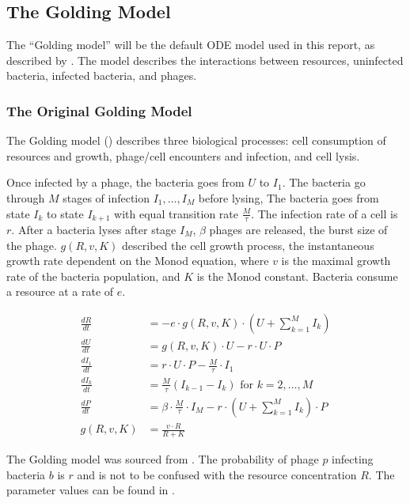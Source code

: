 \subsection{The Golding Model}
\label{sec:golding_model}
The “Golding model” will be the default ODE model used in this report, as described by \citet{gengUsingBacterialPopulation2024}. 
The model describes the interactions between resources, uninfected bacteria, infected bacteria, and phages. 

\subsubsection{The Original Golding Model}
The Golding model () describes three biological processes: cell consumption of resources and growth, phage/cell encounters and infection, and cell lysis. 

Once infected by a phage, the bacteria goes from $U$ to $I_1$. 
The bacteria go through $M$ stages of infection $I_1, \dots, I_M$ before lysing, 
The bacteria goes from state $I_k$ to state $I_{k+1}$ with equal transition rate $\frac{M}{\tau}$. 
The infection rate of a cell is $r$. 
After a bacteria lyses after stage $I_M$, $\beta$ phages are released, the burst size of the phage. 
$g(R, v, K)$ described the cell growth process, the instantaneous growth rate dependent on the Monod equation, where $v$ is the maximal growth rate of the bacteria population, and $K$ is the Monod constant. 
Bacteria consume a resource at a rate of $e$. 

\begin{eqfloat}[ht!]
    \begin{align}
        \frac{dR}{dt} &= -e \cdot g(R, v, K)\cdot (U + \sum_{k=1}^{M} I_k)\\
        \frac{dU}{dt} &= g(R, v, K)\cdot U - r\cdot U \cdot P\\
        \frac{dI_1}{dt} &= r\cdot U \cdot P - \frac{M}{\tau}\cdot I_1\\
        \frac{dI_k}{dt} &= \frac{M}{\tau}(I_{k-1}-I_k) \text{ for } k=2, \dots, M \\
        \frac{dP}{dt} &= \beta \cdot\frac{M}{\tau} \cdot I_M - r\cdot(U + \sum_{k=1}^{M} I_k)\cdot P \\
        g(R, v, K) &= \frac{v\cdot R}{R + K}
        \label{eq:golding_model}
    \end{align}
    \caption{
        The Golding model was sourced from \citet{gengUsingBacterialPopulation2024}.
        The probability of phage $p$ infecting bacteria $b$ is $r$ and is not to be confused with the resource concentration $R$. 
        The parameter values can be found in . 
    }
\end{eqfloat}

